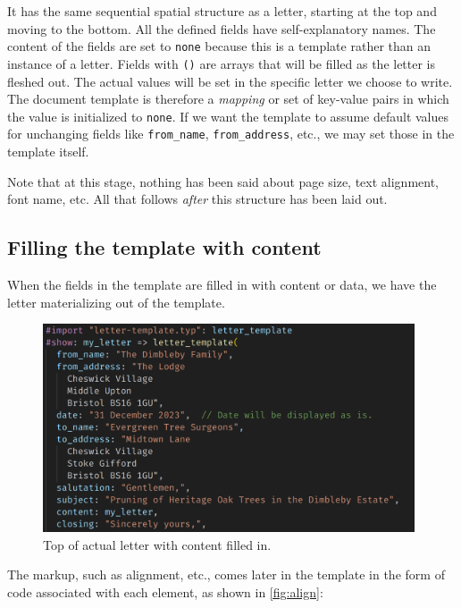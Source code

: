 \documentclass[
  a4paper,
]{article}
\begin{document}
It has the same sequential spatial structure as a letter, starting at
the top and moving to the bottom. All the defined fields have
self-explanatory names. The content of the fields are set to
\texttt{none} because this is a template rather than an instance of a
letter. Fields with \texttt{()} are arrays that will be filled as the
letter is fleshed out. The actual values will be set in the specific
letter we choose to write. The document template is therefore a
\emph{mapping} or set of key-value pairs in which the value is
initialized to \texttt{none}. If we want the template to assume default
values for unchanging fields like \texttt{from\_name},
\texttt{from\_address}, etc., we may set those in the template itself.

Note that at this stage, nothing has been said about page size, text
alignment, font name, etc. All that follows \emph{after} this structure
has been laid out.

\subsection{Filling the template with
content}\label{filling-the-template-with-content}

When the fields in the template are filled in with content or data, we
have the letter materializing out of the template.

\begin{figure}
\centering
\includegraphics[width=0.98\textwidth,height=\textheight]{images/letter-content-top.png}
\caption{Top of actual letter with content filled in.}\label{fig:letter}
\end{figure}

The markup, such as alignment, etc., comes later in the template in the
form of code associated with each element, as shown in \cref{fig:align}:
\end{document}
